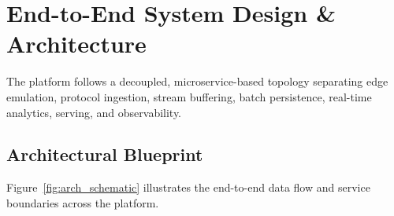 \documentclass[11pt,a4paper]{article}
\begin{document}
\section{End-to-End System Design \& Architecture}

The platform follows a decoupled, microservice-based topology separating edge emulation, protocol ingestion, stream buffering, batch persistence, real-time analytics, serving, and observability.

\subsection{Architectural Blueprint}

Figure~\ref{fig:arch_schematic} illustrates the end-to-end data flow and service boundaries across the platform.
\end{document}
